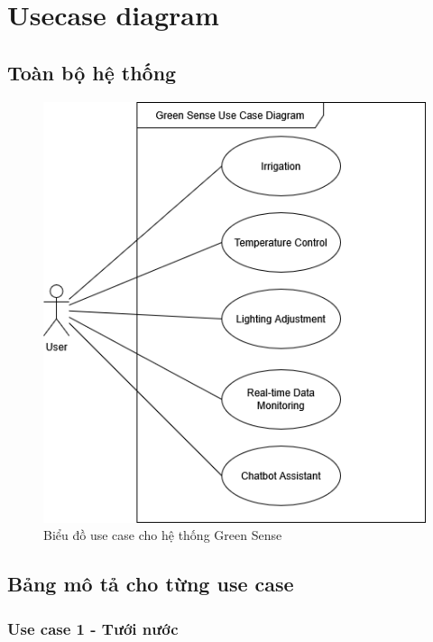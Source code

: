 \section{Usecase diagram}
\subsection{Toàn bộ hệ thống}
\begin{figure}[H]
    \centering
    \includegraphics[width=0.85\linewidth]{content/images/GreenSense_UC_Diagram.png}
    \caption{Biểu đồ use case cho hệ thống Green Sense}
    \label{fig:useCaseDiagram}
\end{figure}
\subsection{Bảng mô tả cho từng use case}
\subsubsection{Use case 1 - Tưới nước}

